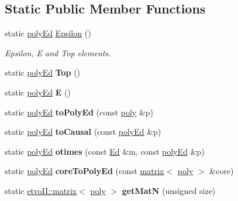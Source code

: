 \subsection*{Static Public Member Functions}
\begin{DoxyCompactItemize}
\item 
\mbox{\label{classetvo_i_i_1_1poly_ed_ab9e33f97a21c328267c9c646e05a001e}} 
static \mbox{\hyperlink{classetvo_i_i_1_1poly_ed}{poly\+Ed}} \mbox{\hyperlink{classetvo_i_i_1_1poly_ed_ab9e33f97a21c328267c9c646e05a001e}{Epsilon}} ()
\begin{DoxyCompactList}\small\item\em Epsilon, E and Top elements. \end{DoxyCompactList}\item 
\mbox{\label{classetvo_i_i_1_1poly_ed_a60cccba880282a54ffadf525f11c6b6a}} 
static \mbox{\hyperlink{classetvo_i_i_1_1poly_ed}{poly\+Ed}} {\bfseries Top} ()
\item 
\mbox{\label{classetvo_i_i_1_1poly_ed_a2c72d93ad0a39ef1da41da5e5bce17c7}} 
static \mbox{\hyperlink{classetvo_i_i_1_1poly_ed}{poly\+Ed}} {\bfseries E} ()
\item 
\mbox{\label{classetvo_i_i_1_1poly_ed_a8ab73f46af25e1efeb8125b395e38834}} 
static \mbox{\hyperlink{classetvo_i_i_1_1poly_ed}{poly\+Ed}} {\bfseries to\+Poly\+Ed} (const \mbox{\hyperlink{classetvo_i_i_1_1poly}{poly}} \&p)
\item 
\mbox{\label{classetvo_i_i_1_1poly_ed_ae24ad92b0ce8a801ca1e69d44fab17e9}} 
static \mbox{\hyperlink{classetvo_i_i_1_1poly_ed}{poly\+Ed}} {\bfseries to\+Causal} (const \mbox{\hyperlink{classetvo_i_i_1_1poly_ed}{poly\+Ed}} \&p)
\item 
\mbox{\label{classetvo_i_i_1_1poly_ed_a971d9ef2be790d11f4c77b10cd96abe1}} 
static \mbox{\hyperlink{classetvo_i_i_1_1poly_ed}{poly\+Ed}} {\bfseries otimes} (const \mbox{\hyperlink{classetvo_i_i_1_1_ed}{Ed}} \&m, const \mbox{\hyperlink{classetvo_i_i_1_1poly_ed}{poly\+Ed}} \&p)
\item 
\mbox{\label{classetvo_i_i_1_1poly_ed_aebabec8fd3cc51d23ad43b51444aa1d0}} 
static \mbox{\hyperlink{classetvo_i_i_1_1poly_ed}{poly\+Ed}} {\bfseries core\+To\+Poly\+Ed} (const \mbox{\hyperlink{classetvo_i_i_1_1matrix}{matrix}}$<$ \mbox{\hyperlink{classetvo_i_i_1_1poly}{poly}} $>$ \&core)
\item 
\mbox{\label{classetvo_i_i_1_1poly_ed_aee49048ec9ca0e6facbd93635f9cf391}} 
static \mbox{\hyperlink{classetvo_i_i_1_1matrix}{etvo\+I\+I\+::matrix}}$<$ \mbox{\hyperlink{classetvo_i_i_1_1poly}{poly}} $>$ {\bfseries get\+MatN} (unsigned size)
\end{DoxyCompactItemize}

